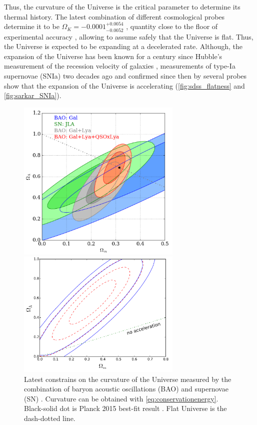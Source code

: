 Thus, the curvature of the Universe is the critical parameter to determine its thermal history. The latest combination of different cosmological probes determine it to be $\Omega_K = -0.0001^{+0.0054}_{-0.0052}$ \cite{2015arXiv150201589P}, quantity close to the floor of experimental accuracy \cite{2016PhRvD..94b3502L}, allowing to assume safely that the Universe is flat. Thus, the Universe is expected to be expanding at a decelerated rate. Although, the expansion of the Universe has been known for a century since Hubble's measurement of the recession velocity of galaxies \cite{1929PNAS...15..168H}, measurements of type-Ia supernovae (SNIa) two decades ago and  confirmed since then by several probes \cite{2008ARA&A..46..385F} show that the expansion of the Universe is accelerating (\autoref{fig:sdss_flatness} and \autoref{fig:sarkar_SNIa}).
\begin{figure}
\begin{center}
\includegraphics[width=0.7\textwidth]{./Pictures/omega_K_sdss.png}
\caption{Latest constrains on the curvature of the Universe measured by the combination of baryon acoustic oscillations (BAO) and supernovae (SN) \cite{2017arXiv170200176B}. Curvature can be obtained with \autoref{eq:conservationenergy}. Black-solid dot is Planck 2015 best-fit result \cite{2015arXiv150201589P}. Flat Universe is the dash-dotted line.}
\label{fig:sdss_flatness}
\vspace*{0.3cm}
\includegraphics[width=0.7\textwidth]{./Pictures/sarkar_acceleration.png}

\end{center}
\end{figure}
